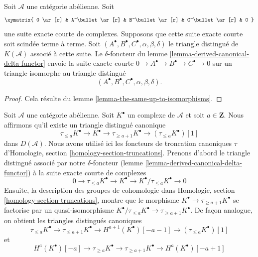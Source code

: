 \begin{lemma}
\label{lemma-derived-compare-triangles-split-case}
Soit $\mathcal{A}$ une catégorie abélienne. Soit
$$
\xymatrix{
0 \ar[r] &
A^\bullet \ar[r] &
B^\bullet \ar[r] &
C^\bullet \ar[r] &
0
}
$$
une suite exacte courte de complexes. Supposons que cette suite exacte courte
soit scindée terme à terme. Soit
$(A^\bullet, B^\bullet, C^\bullet, \alpha, \beta, \delta)$ le triangle
distingué de $K(\mathcal{A})$ associé à cette suite. Le $\delta$-foncteur du
lemme \ref{lemma-derived-canonical-delta-functor} envoie la suite exacte courte
$0 \to A^\bullet \to B^\bullet \to C^\bullet \to 0$ sur un triangle isomorphe
au triangle distingué
$$
(A^\bullet, B^\bullet, C^\bullet, \alpha, \beta, \delta).
$$
\end{lemma}

\begin{proof}
Cela résulte du lemme \ref{lemma-the-same-up-to-isomorphisms}.
\end{proof}

\begin{remark}
\label{remark-truncation-distinguished-triangle}
Soit $\mathcal{A}$ une catégorie abélienne. Soit $K^\bullet$ un complexe de
$\mathcal{A}$ et soit $a \in \mathbf{Z}$. Nous affirmons qu'il existe un
triangle distingué canonique
$$
\tau_{\leq a}K^\bullet \to K^\bullet \to \tau_{\geq a + 1}K^\bullet \to
(\tau_{\leq a}K^\bullet)[1]
$$
dans $D(\mathcal{A})$. Nous avons utilisé ici les foncteurs de troncation canoniques $\tau$
d'Homologie, section \ref{homology-section-truncations}. Prenons d'abord le
triangle distingué associé par notre $\delta$-foncteur
(lemme \ref{lemma-derived-canonical-delta-functor}) à la suite exacte courte de
complexes
$$
0 \to \tau_{\leq a}K^\bullet \to K^\bullet \to
K^\bullet/\tau_{\leq a}K^\bullet \to 0
$$
Ensuite, la description des groupes de cohomologie dans Homologie, section
\ref{homology-section-truncations}, montre que le morphisme
$K^\bullet \to \tau_{\geq a + 1}K^\bullet$ se factorise par un
quasi-isomorphisme
$K^\bullet/\tau_{\leq a}K^\bullet \to \tau_{\geq a + 1}K^\bullet$.
De façon analogue, on obtient les triangles distingués canoniques
$$
\tau_{\leq a}K^\bullet \to \tau_{\leq a + 1}K^\bullet \to
H^{a + 1}(K^\bullet)[-a-1] \to (\tau_{\leq a}K^\bullet)[1]
$$
et
$$
H^a(K^\bullet)[-a] \to \tau_{\geq a}K^\bullet \to
\tau_{\geq a + 1}K^\bullet \to H^a(K^\bullet)[-a + 1]
$$
\end{remark}

